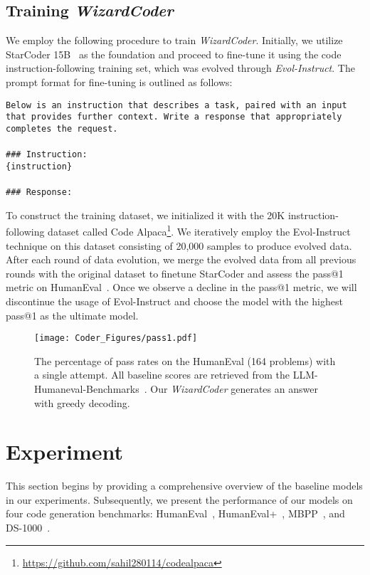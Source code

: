 \documentclass{article}
\newcommand{\name}{\emph{Evol-Instruct}}
\newcommand{\modelname}{\emph{WizardCoder}}
\begin{document}
\subsection{Training \modelname{}}
We employ the following procedure to train \modelname{}. Initially, we utilize StarCoder 15B~\cite{li2023starcoder} as the foundation and proceed to fine-tune it using the code instruction-following training set, which was evolved through \name{}. The prompt format for fine-tuning is outlined as follows:
\begin{boxEnv}
\texttt{Below is an instruction that describes a task, paired with an input that provides further context. Write a response that appropriately completes the request. \\\\\#\#\# Instruction:\\ \{instruction\}\\ \\\#\#\# Response:}
\end{boxEnv}
To construct the training dataset, we initialized it with the 20K instruction-following dataset called Code Alpaca\footnote{\url{https://github.com/sahil280114/codealpaca}}. We iteratively employ the Evol-Instruct technique on this dataset consisting of 20,000 samples to produce evolved data. After each round of data evolution, we merge the evolved data from all previous rounds with the original dataset to finetune StarCoder and assess the pass@1 metric on HumanEval~\cite{humeval}. Once we observe a decline in the pass@1 metric, we will discontinue the usage of Evol-Instruct and choose the model with the highest pass@1 as the ultimate model. \begin{figure}
\centering
     \texttt{[image: Coder\_Figures/pass1.pdf]}
     \caption{The percentage of pass rates on the HumanEval (164 problems) with a single attempt. All baseline scores are retrieved from the LLM-Humaneval-Benchmarks~\cite{llm-humaneval-benchmarks}. Our \modelname{} generates an answer with greedy decoding.}
     \label{fig:pass1}
\end{figure}

\section{Experiment}

This section begins by providing a comprehensive overview of the baseline models in our experiments. Subsequently, we present the performance of our models on four code generation benchmarks: HumanEval~\cite{humeval}, HumanEval+~\cite{humanevalp}, MBPP~\cite{MBPP}, and DS-1000~\cite{DS1000}.
\end{document}
